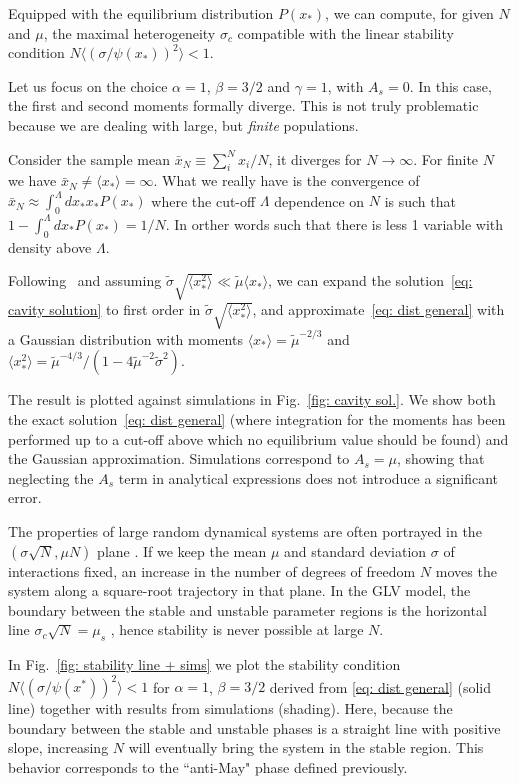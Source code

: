 \documentclass[
 prl,
 twocolumn,
 amsmath,
 amssymb,
 aps,
]{revtex4-2}
\begin{document}
Equipped with the equilibrium distribution $P(x_*)$, we can compute, for given $N$ and $\mu$, the maximal heterogeneity $\sigma_c$ compatible with the linear stability condition $N\langle (\sigma/\psi(x_*))^2\rangle < 1$. 

Let us focus on the choice $\alpha=1$, $\beta=3/2$ and $\gamma=1$, with $A_s=0$.  
In this case, the first and second moments formally diverge.
This is not truly problematic because we are dealing with large, but \emph{finite} populations.

Consider the sample mean $\bar{x}_{N}\equiv\sum_{i}^N x_i /N$, it diverges for $N\to\infty$. For finite $N$ we have $\bar{x}_N\neq\langle x_*\rangle=\infty$. What we really have is the convergence of $\bar{x}_N \approx \int_0^{\Lambda}dx_*x_*P(x_*)$ where the cut-off $\Lambda$ dependence on $N$ is such that $1-\int_0^{\Lambda}dx_*P(x_*)=1/N$. In orther words such that there is less 1 variable with density above $\Lambda$.

Following~\cite{Cui2020,Hatton2024} and assuming $\tilde{\sigma} \sqrt{\langle x_*^2\rangle}\ll \tilde{\mu}  \langle x_* \rangle$, we can expand the solution~\eqref{eq: cavity solution} to first order in $\tilde{\sigma} \sqrt{\langle x_*^2\rangle}$, and approximate~\eqref{eq: dist general} with a Gaussian distribution with moments $\langle x_*\rangle=\tilde{\mu}^{-2/3}$ and $\langle x_*^2\rangle=\tilde{\mu}^{-4/3}/(1-4\tilde{\mu}^{-2}\tilde{\sigma}^2)$. 

The result is plotted against simulations in Fig.~\ref{fig: cavity sol.}. We show both the exact solution~\eqref{eq: dist general} (where integration for the moments has been performed up to a cut-off above which no equilibrium value should be found) and the Gaussian approximation. Simulations correspond to $A_s=\mu$, showing that neglecting the $A_s$ term in analytical expressions does not introduce a significant error. 


The properties of large random dynamical systems are often portrayed in the $(\sigma \sqrt{N},\mu N)$ plane \cite{bunin2017ecological}. If we keep the mean $\mu$ and standard deviation $\sigma$ of interactions fixed, an increase in the number of degrees of freedom $N$ moves the system along a square-root trajectory in that plane. In the GLV model, the boundary between the stable and unstable parameter regions is the horizontal line $\sigma_c\sqrt{N} = \mu_s$ \cite{bunin2017ecological}, hence stability is never possible at large $N$. 

In Fig.~\ref{fig: stability line + sims} we plot the stability condition $N\langle (\sigma/\psi(x^*))^2\rangle < 1$ for $\alpha = 1$, $\beta = 3/2$ derived from \eqref{eq: dist general} (solid line) together with results from simulations (shading). Here, because the boundary between the stable and unstable phases is a straight line with positive slope, increasing $N$ will eventually bring the system in the stable region. This behavior corresponds to the ``anti-May" phase defined previously. 
\end{document}
